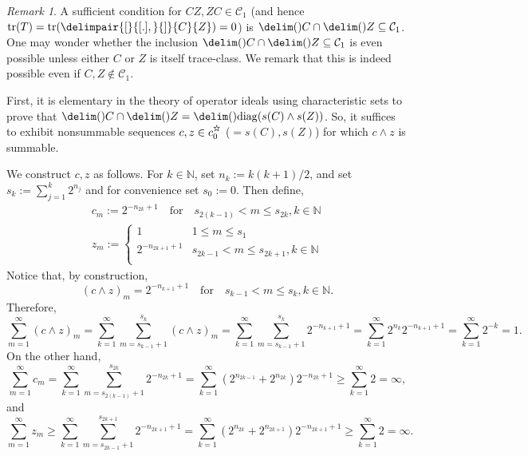 \documentclass[10pt,reqno]{amsart}
\theoremstyle{remark}
\newtheorem{remark}[theorem]{Remark}
\newcommand\openbigstar[1][0.65]{%
  \scalerel*{%
    \stackinset{c}{0pt}{c}{}{\scalebox{#1}{\color{white}{$\bigstar$}}}{%
      $\bigstar$}%
  }{\bigstar}
}
\DeclareMathOperator{\diag}{diag}
\DeclareMathOperator{\trace}{tr}
\newcommand{\ideal}{\delim()}
\newcommand{\comm}{\delimpair{[}{[.],}{]}}
\newcommand{\schatten}[1]{\mathcal{C}_{#1}}
\renewcommand{\star}{\openbigstar}
\newcommand{\czstar}{c_0^{\star}}
\numberwithin{equation}{section}
\begin{document}
\begin{remark}
  \label{rem:intersection-trace-class}
  A sufficient condition for $CZ,ZC \in \schatten{1}$ (and hence $\trace(T) = \trace(\comm{C}{Z}) = 0$) is $\ideal{C} \cap \ideal{Z} \subseteq \schatten{1}$.
  One may wonder whether the inclusion $\ideal{C} \cap \ideal{Z} \subseteq \schatten{1}$ is even possible unless either $C$ or $Z$ is itself trace-class.
  We remark that this is indeed possible even if $C,Z \notin \schatten{1}$.

  First, it is elementary in the theory of operator ideals using characteristic sets to prove that $\ideal{C} \cap \ideal{Z} = \ideal{\diag (s(C) \wedge s(Z))}$.
  So, it suffices to exhibit nonsummable sequences $c,z \in \czstar$ ($=s(C),s(Z)$) for which $c \wedge z$ is summable.

  We construct $c,z$ as follows.
  For $k \in \mathbb{N}$, set $n_k := k(k+1)/2$, and set $s_k := \sum_{j=1}^k 2^{n_j}$ and for convenience set $s_0 := 0$.
  Then define,
  \begin{gather*}
    c_m := 2^{-n_{2k} + 1}
    \quad\text{for}\quad
    s_{2(k-1)} < m \le s_{2k}, k \in \mathbb{N} \\
    z_m :=
    \begin{cases}
      1 & 1 \le m \le s_1 \\
      2^{-n_{2k+1} + 1}  & s_{2k-1} < m \le s_{2k+1}, k \in \mathbb{N} \\
    \end{cases}
  \end{gather*}
  Notice that, by construction,
  \begin{equation*}
    (c \wedge z)_m = 2^{-n_{k+1} + 1}
    \quad\text{for}\quad
    s_{k-1} < m \le s_k, k \in \mathbb{N}.
  \end{equation*}
  Therefore,
  \begin{equation*}
    \sum_{m=1}^{\infty} (c \wedge z)_m = \sum_{k=1}^{\infty} \sum_{m=s_{k-1} + 1}^{s_k} (c \wedge z)_m = \sum_{k=1}^{\infty} \sum_{m=s_{k-1} + 1}^{s_k} 2^{-n_{k+1} + 1} = \sum_{k=1}^{\infty} 2^{n_k} 2^{-n_{k+1} + 1} = \sum_{k=1}^{\infty} 2^{-k} = 1.
  \end{equation*}
  On the other hand,
  \begin{equation*}
    \sum_{m=1}^{\infty} c_m = \sum_{k=1}^{\infty} \sum_{m=s_{2(k-1)} + 1}^{s_{2k}} 2^{-n_{2k} + 1} = \sum_{k=1}^{\infty} (2^{n_{2k-1}} + 2^{n_{2k}}) 2^{-n_{2k} + 1} \ge \sum_{k=1}^{\infty} 2 = \infty,
  \end{equation*}
  and
  \begin{equation*}
    \sum_{m=1}^{\infty} z_m \ge \sum_{k=1}^{\infty} \sum_{m=s_{2k-1} + 1}^{s_{2k+1}} 2^{-n_{2k+1} + 1} = \sum_{k=1}^{\infty} (2^{n_{2k}} + 2^{n_{2k+1}}) 2^{-n_{2k+1} + 1} \ge \sum_{k=1}^{\infty} 2 = \infty.
  \end{equation*}
\end{remark}
\end{document}

